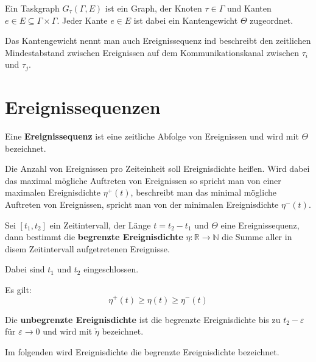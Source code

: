 \begin{tcolorbox}
    Ein Taskgraph $G_\tau(\Gamma, E)$ ist ein Graph, der Knoten $\tau \in \Gamma$ und
    Kanten $e \in E \subseteq \Gamma \times \Gamma$. Jeder Kante $e \in E$ ist dabei ein
    Kantengewicht $\Theta$ zugeordnet.

    Das Kantengewicht nennt man auch Ereignissequenz ind beschreibt den zeitlichen
    Mindestabstand zwischen Ereignissen auf dem Kommunikationskanal zwischen $\tau_i$
    und $\tau_j$.
\end{tcolorbox}

\section{Ereignissequenzen}
\begin{tcolorbox}
    Eine \textbf{Ereignissequenz} ist eine zeitliche Abfolge von Ereignissen und wird
    mit $\Theta$ bezeichnet.
\end{tcolorbox}

Die Anzahl von Ereignissen pro Zeiteinheit soll Ereignisdichte heißen. Wird dabei das
maximal mögliche Auftreten von Ereignissen so spricht man von einer maximalen 
Ereignisdichte $\eta^+(t)$, beschreibt man das minimal mögliche Auftreten von Ereignissen,
spricht man von der minimalen Ereignisdichte $\eta^-(t)$.

\begin{tcolorbox}
    Sei $[t_1, t_2]$ ein Zeitintervall, der Länge $t=t_2-t_1$ und $\Theta$ eine
    Ereignissequenz, dann bestimmt die \textbf{begrenzte Ereignisdichte} $\eta: \mathbb{R}
    \to \mathbb{N}$ die Summe aller in disem Zeitintervall aufgetretenen Ereignisse.

    Dabei sind $t_1$ und $t_2$ eingeschlossen.
\end{tcolorbox}

\begin{tcolorbox}
    Es gilt:
    \begin{equation}
        \eta^+(t) \geq \eta(t) \geq \eta^-(t)
    \end{equation}
\end{tcolorbox}

\begin{tcolorbox}
    Die \textbf{unbegrenzte Ereignisdichte} ist die begrenzte Ereignisdichte
    bis zu $t_2 - \varepsilon$ für $\varepsilon \to 0$ und wird mit 
    $\check{\eta}$ bezeichnet.
\end{tcolorbox}

Im folgenden wird Ereignisdichte die begrenzte Ereignisdichte bezeichnet.

